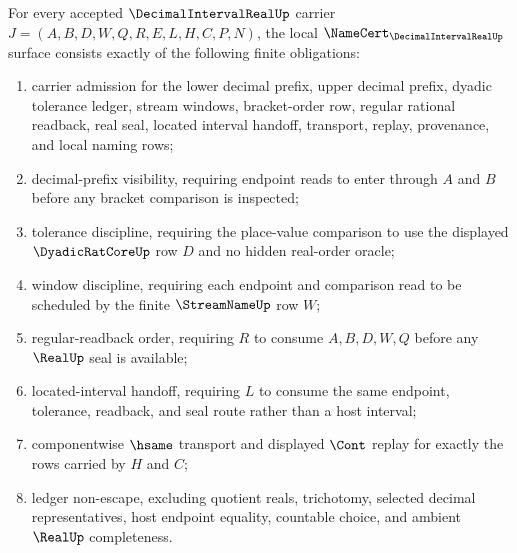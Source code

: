 \begin{theorem}
\label{thm:decimal-interval-real-namecert-obligations}
For every accepted $\DecimalIntervalRealUp$ carrier $J=(A,B,D,W,Q,R,E,L,H,C,P,N)$, the local $\NameCert_{\DecimalIntervalRealUp}$ surface consists exactly of the following finite obligations:
\begin{enumerate}
\item carrier admission for the lower decimal prefix, upper decimal prefix, dyadic tolerance ledger, stream windows, bracket-order row, regular rational readback, real seal, located interval handoff, transport, replay, provenance, and local naming rows;
\item decimal-prefix visibility, requiring endpoint reads to enter through $A$ and $B$ before any bracket comparison is inspected;
\item tolerance discipline, requiring the place-value comparison to use the displayed $\DyadicRatCoreUp$ row $D$ and no hidden real-order oracle;
\item window discipline, requiring each endpoint and comparison read to be scheduled by the finite $\StreamNameUp$ row $W$;
\item regular-readback order, requiring $R$ to consume $A,B,D,W,Q$ before any $\RealUp$ seal is available;
\item located-interval handoff, requiring $L$ to consume the same endpoint, tolerance, readback, and seal route rather than a host interval;
\item componentwise $\hsame$ transport and displayed $\Cont$ replay for exactly the rows carried by $H$ and $C$;
\item ledger non-escape, excluding quotient reals, trichotomy, selected decimal representatives, host endpoint equality, countable choice, and ambient $\RealUp$ completeness.
\end{enumerate}
\end{theorem}
